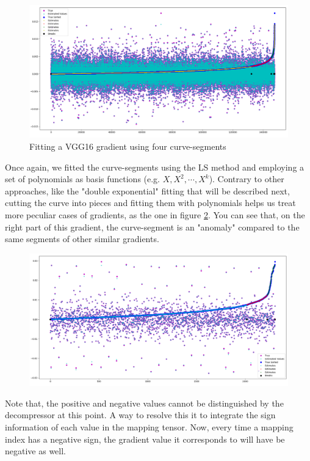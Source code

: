     \begin{figure}[h]
    \centering
    \includegraphics[width=1\textwidth]{thesis/figures/vgg16-6gradient.png}
    \caption{Fitting a VGG16 gradient using four curve-segments}
    \label{vgg16-gradient}
    \end{figure}
    
    Once again, we fitted the curve-segments using the LS method and employing a set of polynomials as basis functions (e.g. $X, X^2,\cdots,X^k$). 
    Contrary to other approaches, like the "double exponential" fitting that will be described next, cutting the curve into pieces and fitting them with polynomials helps us treat more peculiar cases of gradients, as the one in figure \ref{segmented_4}.
    You can see that, on the right part of this gradient, the curve-segment is an "anomaly" compared to the same segments of other similar gradients.
    
    \begin{figure}[h]
    \centering
    \includegraphics[width=1\textwidth]{thesis/figures/segmented_4gradient.png}
    \caption{}
    \label{segmented_4}
    \end{figure}

    Note that, the positive and negative values cannot be distinguished by the decompressor at this point. A way to resolve this it to integrate the sign information of each value in the mapping tensor. Now, every time a mapping index has a negative sign, the gradient value it corresponds to will have be negative as well.


